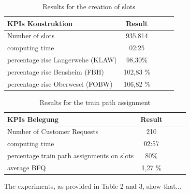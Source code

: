 \begin{table}[h]
	\centering
	\caption{Results for the creation of slots}
	\label{tab:result_Netzfpl}
	\begin{tabular}{lcccc} \hline
		\textbf{KPIs Konstruktion}   & \textbf{Result}  \\ \hline
		Number of slots             & 935.814                      \\
		computing time       & 02:25                     \\
		percentage rise Langerwehe (KLAW)   & 98,30\%                       \\
		percentage rise Bensheim (FBH) & 102,83 \%                       \\ 
		percentage rise Oberwesel (FOBW) & 106,82 \%                     \\ \hline
	\end{tabular}
\end{table}
\par

\begin{table}[h]
	\centering
	\caption{Results for the train path assignment}
	\label{tab:result_Netzfpl_Bel}
	\begin{tabular}{lcccc} \hline
		\textbf{KPIs Belegung}   & \textbf{Result}  \\ \hline
		Number of Customer Requests             & 210                      \\
		computing time       & 02:57                     \\
		percentage train path assignments on slots   & 80\%                       \\
		average BFQ & 1,27 \%                             \\ \hline
	\end{tabular}
\end{table}
\par

The experiments, as provided in Table 2 and 3, show that...